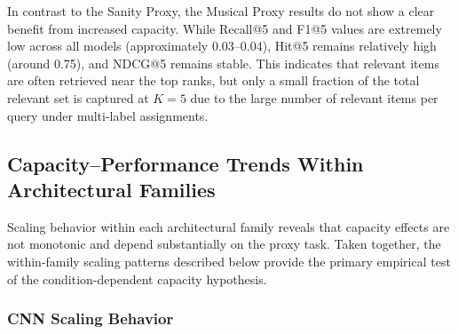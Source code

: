 \documentclass{article}
\begin{document}
\begin{table}[!htbp]
\centering
\caption{Primary Musical Proxy Results (Character Retrieval). Metrics reported are corpus-level mean values at rank 5.}
\label{tab:musical_results}
\end{table}

In contrast to the Sanity Proxy, the Musical Proxy results do not show a clear benefit from increased capacity. While Recall@5 and F1@5 values are extremely low across all models (approximately 0.03--0.04), Hit@5 remains relatively high (around 0.75), and NDCG@5 remains stable. This indicates that relevant items are often retrieved near the top ranks, but only a small fraction of the total relevant set is captured at $K=5$ due to the large number of relevant items per query under multi-label assignments.

\subsection{Capacity--Performance Trends Within Architectural Families}

Scaling behavior within each architectural family reveals that capacity effects are not monotonic and depend substantially on the proxy task. Taken together, the within-family scaling patterns described below provide the primary empirical test of the condition-dependent capacity hypothesis.

\subsubsection{CNN Scaling Behavior}
\end{document}
